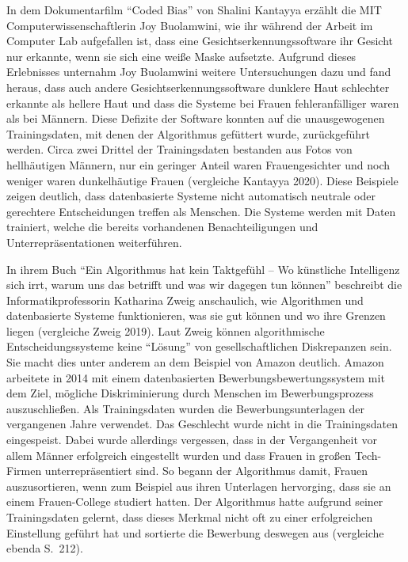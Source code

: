 \documentclass[a4paper,
fontsize=11pt,
oneside,
numbers=noperiodatend,
parskip=half-,
bibliography=totoc,
final
]{scrartcl}
\begin{document}
In dem Dokumentarfilm \enquote{Coded Bias} von Shalini Kantayya erzählt
die MIT Computerwissenschaftlerin Joy Buolamwini, wie ihr während der
Arbeit im Computer Lab aufgefallen ist, dass eine
Gesichtserkennungssoftware ihr Gesicht nur erkannte, wenn sie sich eine
weiße Maske aufsetzte. Aufgrund dieses Erlebnisses unternahm Joy
Buolamwini weitere Untersuchungen dazu und fand heraus, dass auch andere
Gesichtserkennungssoftware dunklere Haut schlechter erkannte als hellere
Haut und dass die Systeme bei Frauen fehleranfälliger waren als bei
Männern. Diese Defizite der Software konnten auf die unausgewogenen
Trainingsdaten, mit denen der Algorithmus gefüttert wurde, zurückgeführt
werden. Circa zwei Drittel der Trainingsdaten bestanden aus Fotos von
hellhäutigen Männern, nur ein geringer Anteil waren Frauengesichter und
noch weniger waren dunkelhäutige Frauen (vergleiche Kantayya 2020). Diese
Beispiele zeigen deutlich, dass datenbasierte Systeme nicht automatisch
neutrale oder gerechtere Entscheidungen treffen als Menschen. Die
Systeme werden mit Daten trainiert, welche die bereits vorhandenen
Benachteiligungen und Unterrepräsentationen weiterführen.

In ihrem Buch \enquote{Ein Algorithmus hat kein Taktgefühl -- Wo
künstliche Intelligenz sich irrt, warum uns das betrifft und was wir
dagegen tun können} beschreibt die Informatikprofessorin Katharina Zweig
anschaulich, wie Algorithmen und datenbasierte Systeme funktionieren,
was sie gut können und wo ihre Grenzen liegen (vergleiche Zweig 2019). Laut
Zweig können algorithmische Entscheidungssysteme keine \enquote{Lösung}
von gesellschaftlichen Diskrepanzen sein. Sie macht dies unter anderem
an dem Beispiel von Amazon deutlich. Amazon arbeitete in 2014 mit einem
datenbasierten Bewerbungsbewertungssystem mit dem Ziel, mögliche
Diskriminierung durch Menschen im Bewerbungsprozess auszuschließen. Als
Trainingsdaten wurden die Bewerbungsunterlagen der vergangenen Jahre
verwendet. Das Geschlecht wurde nicht in die Trainingsdaten eingespeist.
Dabei wurde allerdings vergessen, dass in der Vergangenheit vor allem
Männer erfolgreich eingestellt wurden und dass Frauen in großen
Tech-Firmen unterrepräsentiert sind. So begann der Algorithmus damit,
Frauen auszusortieren, wenn zum Beispiel aus ihren Unterlagen
hervorging, dass sie an einem Frauen-College studiert hatten. Der
Algorithmus hatte aufgrund seiner Trainingsdaten gelernt, dass dieses
Merkmal nicht oft zu einer erfolgreichen Einstellung geführt hat und
sortierte die Bewerbung deswegen aus (vergleiche ebenda S.~212).
\end{document}
